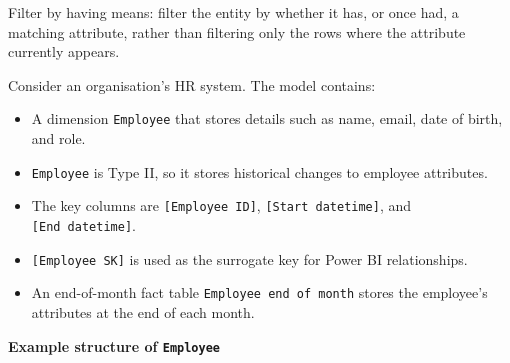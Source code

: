 \documentclass[10pt,openany,10pt]{book}
\providecommand{\tightlist}{%
  \setlength{\itemsep}{0pt}\setlength{\parskip}{0pt}}
\begin{document}
Filter by having means: filter the entity by whether it has, or once
had, a matching attribute, rather than filtering only the rows where the
attribute currently appears.

Consider an organisation's HR system. The model contains:

\begin{itemize}
\tightlist
\item
  A dimension \texttt{\textquotesingle{}Employee\textquotesingle{}} that
  stores details such as name, email, date of birth, and role.
\item
  \texttt{\textquotesingle{}Employee\textquotesingle{}} is Type II, so
  it stores historical changes to employee attributes.
\item
  The key columns are \texttt{{[}Employee\ ID{]}},
  \texttt{{[}Start\ datetime{]}}, and \texttt{{[}End\ datetime{]}}.
\item
  \texttt{{[}Employee\ SK{]}} is used as the surrogate key for Power BI
  relationships.
\item
  An end-of-month fact table
  \texttt{\textquotesingle{}Employee\ end\ of\ month\textquotesingle{}}
  stores the employee's attributes at the end of each month.
\end{itemize}

\textbf{Example structure of
\texttt{\textquotesingle{}Employee\textquotesingle{}}}
\end{document}
